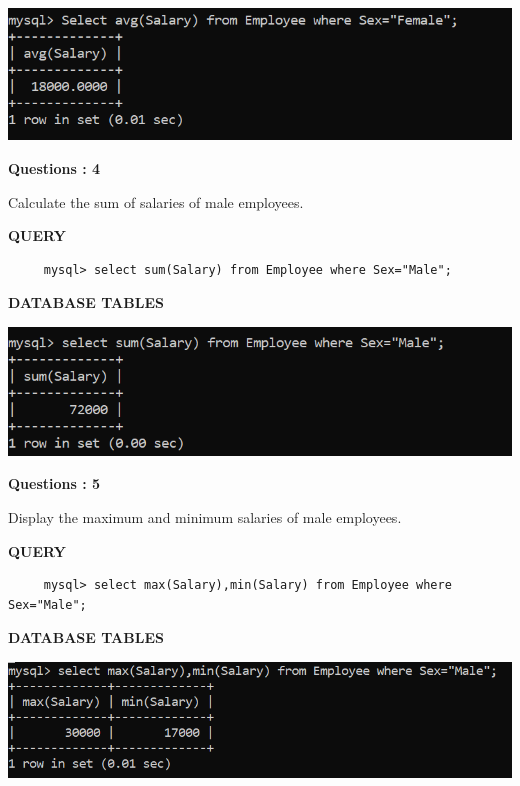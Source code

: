 \documentclass[a4paper,12pt]{report}
\begin{document}
\includegraphics[scale=1]{avg.png}
\begin{flushleft}
    \textbf{Questions : 4}
\end{flushleft}
Calculate the sum of salaries of male employees.
	\begin{flushleft}
		\textbf{QUERY }
	\end{flushleft}
 \begin{verbatim}
     mysql> select sum(Salary) from Employee where Sex="Male";
 \end{verbatim}
\begin{flushleft}
		\textbf{DATABASE TABLES} 
\end{flushleft} 

\includegraphics[scale=1]{sum.png}
\begin{flushleft}
    \textbf{Questions : 5}
\end{flushleft}
Display the maximum and minimum salaries of male employees.
	\begin{flushleft}
		\textbf{QUERY }
	\end{flushleft}
 \begin{verbatim}
     mysql> select max(Salary),min(Salary) from Employee where Sex="Male";
 \end{verbatim}
\begin{flushleft}
		\textbf{DATABASE TABLES} 
\end{flushleft} 

\includegraphics[scale=1]{minmax.png}
\end{document}
